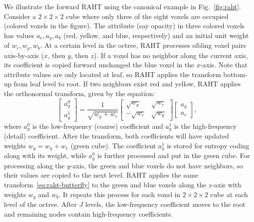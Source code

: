 We illustrate the forward RAHT using the canonical example in Fig.~\ref{fig:raht}. 
%
Consider a $2 \times 2 \times2$ cube where only three of the eight voxels are occupied (colored voxels in the figure). 
%
The attribute (say opacity) in three colored voxels has values $a_r,a_y,a_b$ (red, yellow, and blue, respectively) and an initial unit weight of $w_r,w_y,w_b$.
%
At a certain level in the octree, RAHT processes sibling voxel pairs axis-by-axis ($x$, then $y$, then $z$). If a voxel has no neighbor along the current axis, its coefficient is copied forward unchanged \eg the blue voxel in the $x$-axis.
%
Note that attribute values are only located at leaf, so RAHT applies the transform bottom-up from leaf level to root.
%
%
If two neighbors exist \eg red and yellow, RAHT applies the orthonormal transform, given by the equation:
\begin{equation}
  \begin{bmatrix}
  a_g^0\\
  a_g^1
  \end{bmatrix}
  =
  \frac{1}{\sqrt{w_y+w_r}}
  \begin{bmatrix}
  \sqrt{w_y} & \sqrt{w_r}\\
  -\sqrt{w_r} & \sqrt{w_y}
  \end{bmatrix}
  \begin{bmatrix}
  a_y\\
  a_r
  \end{bmatrix},
  \label{eq:raht-butterfly}
\end{equation}
where $a_g^0$ is the low-frequency (coarse) coefficient and $a_g^1$ is the high-frequency (detail) coefficient.
%
After the transform, both coefficients will have updated weights $w_g = w_y + w_r$ (green cube). 
%
The coefficient $a_g^1$ is stored for entropy coding along with its weight, while $a_g^0$ is further processed and put in the green cube.
%
For processing along the $y$-axis, the green and blue voxels do not have neighbors, so their values are copied to the next level.
%
RAHT applies the same transform~\ref{eq:raht-butterfly} to the green and blue voxels along the $z$-axis with weights $w_g$ and $w_b$.
%
It repeats this process for each voxel in $2 \times 2 \times2$ cube at each level of the octree. 
%
After $J$ levels, the low-frequency coefficient moves to the root and remaining nodes contain high-frequency coefficients.
